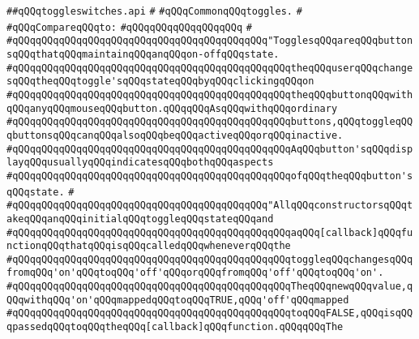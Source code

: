 \label{src/lib/x-kit/widget/old/leaf/toggleswitches.api}
\verb|##qQQqtoggleswitches.api|\newline
\verb|#|\newline
\verb|#qQQqCommonqQQqtoggles.|\newline
\verb|#|\newline
\verb|#qQQqCompareqQQqto:|\newline
\verb|#qQQqqQQqqQQqqQQqqQQq|\newline
\verb|#|\newline
\verb|#qQQqqQQqqQQqqQQqqQQqqQQqqQQqqQQqqQQqqQQqqQQq"TogglesqQQqareqQQqbuttonsqQQqthatqQQqmaintainqQQqanqQQqon-offqQQqstate.|\newline
\verb|#qQQqqQQqqQQqqQQqqQQqqQQqqQQqqQQqqQQqqQQqqQQqqQQqtheqQQquserqQQqchangesqQQqtheqQQqtoggle'sqQQqstateqQQqbyqQQqclickingqQQqon|\newline
\verb|#qQQqqQQqqQQqqQQqqQQqqQQqqQQqqQQqqQQqqQQqqQQqqQQqtheqQQqbuttonqQQqwithqQQqanyqQQqmouseqQQqbutton.qQQqqQQqAsqQQqwithqQQqordinary|\newline
\verb|#qQQqqQQqqQQqqQQqqQQqqQQqqQQqqQQqqQQqqQQqqQQqqQQqbuttons,qQQqtoggleqQQqbuttonsqQQqcanqQQqalsoqQQqbeqQQqactiveqQQqorqQQqinactive.|\newline
\verb|#qQQqqQQqqQQqqQQqqQQqqQQqqQQqqQQqqQQqqQQqqQQqqQQqAqQQqbutton'sqQQqdisplayqQQqusuallyqQQqindicatesqQQqbothqQQqaspects|\newline
\verb|#qQQqqQQqqQQqqQQqqQQqqQQqqQQqqQQqqQQqqQQqqQQqqQQqofqQQqtheqQQqbutton'sqQQqstate.|\newline
\verb|#|\newline
\verb|#qQQqqQQqqQQqqQQqqQQqqQQqqQQqqQQqqQQqqQQqqQQq"AllqQQqconstructorsqQQqtakeqQQqanqQQqinitialqQQqtoggleqQQqstateqQQqand|\newline
\verb|#qQQqqQQqqQQqqQQqqQQqqQQqqQQqqQQqqQQqqQQqqQQqqQQqaqQQq[callback]qQQqfunctionqQQqthatqQQqisqQQqcalledqQQqwheneverqQQqthe|\newline
\verb|#qQQqqQQqqQQqqQQqqQQqqQQqqQQqqQQqqQQqqQQqqQQqqQQqtoggleqQQqchangesqQQqfromqQQq'on'qQQqtoqQQq'off'qQQqorqQQqfromqQQq'off'qQQqtoqQQq'on'.|\newline
\verb|#qQQqqQQqqQQqqQQqqQQqqQQqqQQqqQQqqQQqqQQqqQQqqQQqTheqQQqnewqQQqvalue,qQQqwithqQQq'on'qQQqmappedqQQqtoqQQqTRUE,qQQq'off'qQQqmapped|\newline
\verb|#qQQqqQQqqQQqqQQqqQQqqQQqqQQqqQQqqQQqqQQqqQQqqQQqtoqQQqFALSE,qQQqisqQQqpassedqQQqtoqQQqtheqQQq[callback]qQQqfunction.qQQqqQQqThe|\newline
